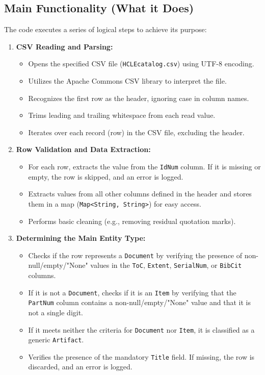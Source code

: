 \subsection{Main Functionality (What it Does)}
The code executes a series of logical steps to achieve its purpose:

\begin{enumerate}
    \item \textbf{CSV Reading and Parsing:}
        \begin{itemize}
            \item Opens the specified CSV file (\texttt{HCLEcatalog.csv}) using UTF-8 encoding.
            \item Utilizes the Apache Commons CSV library to interpret the file.
            \item Recognizes the first row as the header, ignoring case in column names.
            \item Trims leading and trailing whitespace from each read value.
            \item Iterates over each record (row) in the CSV file, excluding the header.
        \end{itemize}

    \item \textbf{Row Validation and Data Extraction:}
        \begin{itemize}
            \item For each row, extracts the value from the \texttt{IdNum} column. If it is missing or empty, the row is skipped, and an error is logged.
            \item Extracts values from all other columns defined in the header and stores them in a map (\texttt{Map<String, String>}) for easy access.
            \item Performs basic cleaning (e.g., removing residual quotation marks).
        \end{itemize}

    \item \textbf{Determining the Main Entity Type:}
        \begin{itemize}
            \item Checks if the row represents a \texttt{Document} by verifying the presence of non-null/empty/"None" values in the \texttt{ToC}, \texttt{Extent}, \texttt{SerialNum}, or \texttt{BibCit} columns.
            \item If it is not a \texttt{Document}, checks if it is an \texttt{Item} by verifying that the \texttt{PartNum} column contains a non-null/empty/"None" value and that it is not a single digit.
            \item If it meets neither the criteria for \texttt{Document} nor \texttt{Item}, it is classified as a generic \texttt{Artifact}.
            \item Verifies the presence of the mandatory \texttt{Title} field. If missing, the row is discarded, and an error is logged.
        \end{itemize}


\end{enumerate}
